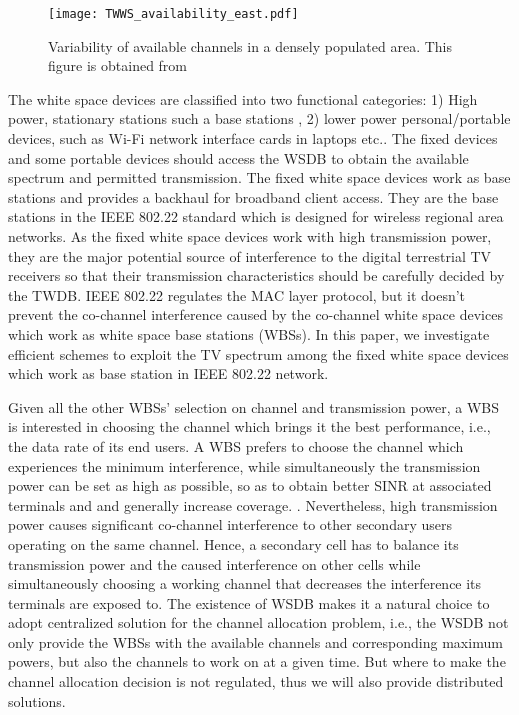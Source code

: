 \documentclass[times]{ettauth}
\newcommand{\ie}{i.e., }
\theoremstyle{mytheoremstyle}
\theoremstyle{mytheoremstyle}
\theoremstyle{mytheoremstyle}
\begin{document}
\begin{figure}[h!]
  \centering
  \texttt{[image: TWWS\_availability\_east.pdf]}
  \caption{Variability of available channels in a densely populated area. This figure is obtained from \cite{googleDatabase}}
\label{variability_TVWS}
\end{figure}

The white space devices are classified into two functional categories: 1) High power, stationary stations such a base stations , 2) lower power personal/portable devices, such as Wi-Fi network interface cards in laptops etc..
The fixed devices and some portable devices should access the WSDB to obtain the available spectrum and permitted transmission.
%
The fixed white space devices work as base stations and provides a backhaul for broadband client access.
They are the base stations in the IEEE 802.22 standard which is designed for wireless regional area networks.
As the fixed white space devices work with high transmission power, they are the major potential source of interference to the digital terrestrial TV receivers so that their transmission characteristics should be carefully decided by the TWDB.
IEEE 802.22 regulates the MAC layer protocol, but it doesn't prevent the co-channel interference caused by the co-channel white space devices which work as white space base stations (WBSs).
In this paper, we investigate efficient schemes to exploit the TV spectrum among the fixed white space devices which work as base station in IEEE 802.22 network.

Given all the other WBSs' selection on channel and transmission power, a WBS is interested in choosing the channel which brings it the best performance, \ie the data rate of its end users.
A WBS prefers to choose the channel which experiences the minimum interference, while simultaneously the transmission power can be set as high as possible, so as to obtain better SINR at associated terminals and and generally increase coverage. \cite{wuinfocom09, HoangPowerChannel2010}. 
Nevertheless, high transmission power causes significant co-channel interference to other secondary users operating on the same channel. 
Hence, a secondary cell has to balance its transmission power and the caused interference on other cells while simultaneously choosing a working channel that decreases the interference its terminals are exposed to.
The existence of WSDB makes it a natural choice to adopt centralized solution for the channel allocation problem, \ie the WSDB not only provide the WBSs with the available channels and corresponding maximum powers, but also the channels to work on at a given time.
But where to make the channel allocation decision is not regulated, thus we will also provide distributed solutions.
\end{document}
